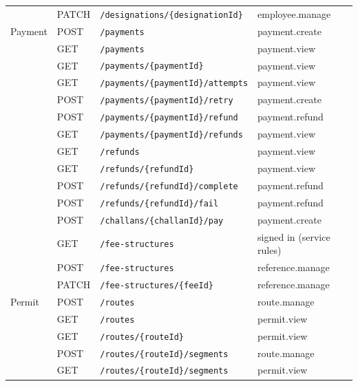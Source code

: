 \begin{longtable}{@{}p{2.1cm}l p{6.6cm} p{3.2cm}@{}}
 & PATCH & \texttt{/\allowbreak{}designations/\allowbreak{}\{designationId\}} & employee.manage \\
Payment & POST & \texttt{/\allowbreak{}payments} & payment.create \\
 & GET & \texttt{/\allowbreak{}payments} & payment.view \\
 & GET & \texttt{/\allowbreak{}payments/\allowbreak{}\{paymentId\}} & payment.view \\
 & GET & \texttt{/\allowbreak{}payments/\allowbreak{}\{paymentId\}/\allowbreak{}attempts} & payment.view \\
 & POST & \texttt{/\allowbreak{}payments/\allowbreak{}\{paymentId\}/\allowbreak{}retry} & payment.create \\
 & POST & \texttt{/\allowbreak{}payments/\allowbreak{}\{paymentId\}/\allowbreak{}refund} & payment.refund \\
 & GET & \texttt{/\allowbreak{}payments/\allowbreak{}\{paymentId\}/\allowbreak{}refunds} & payment.view \\
 & GET & \texttt{/\allowbreak{}refunds} & payment.view \\
 & GET & \texttt{/\allowbreak{}refunds/\allowbreak{}\{refundId\}} & payment.view \\
 & POST & \texttt{/\allowbreak{}refunds/\allowbreak{}\{refundId\}/\allowbreak{}complete} & payment.refund \\
 & POST & \texttt{/\allowbreak{}refunds/\allowbreak{}\{refundId\}/\allowbreak{}fail} & payment.refund \\
 & POST & \texttt{/\allowbreak{}challans/\allowbreak{}\{challanId\}/\allowbreak{}pay} & payment.create \\
 & GET & \texttt{/\allowbreak{}fee-structures} & signed in (service rules) \\
 & POST & \texttt{/\allowbreak{}fee-structures} & reference.manage \\
 & PATCH & \texttt{/\allowbreak{}fee-structures/\allowbreak{}\{feeId\}} & reference.manage \\
Permit & POST & \texttt{/\allowbreak{}routes} & route.manage \\
 & GET & \texttt{/\allowbreak{}routes} & permit.view \\
 & GET & \texttt{/\allowbreak{}routes/\allowbreak{}\{routeId\}} & permit.view \\
 & POST & \texttt{/\allowbreak{}routes/\allowbreak{}\{routeId\}/\allowbreak{}segments} & route.manage \\
 & GET & \texttt{/\allowbreak{}routes/\allowbreak{}\{routeId\}/\allowbreak{}segments} & permit.view \\

\end{longtable}

